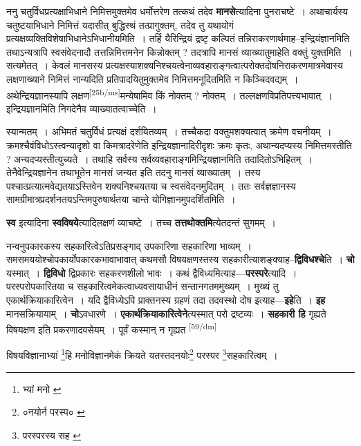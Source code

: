 \documentclass[article,12pt,a4paper]{memoir}
\begin{document}
	  \pstart ननु चतुर्विधप्रत्यक्षाभिधाने निमित्तमुक्तमेव धर्मोत्तरेण तत्कथं तदेव \textbf{मानसे}त्यादिना पुनराचष्टे । अथाचार्यस्य चतुष्टयाभिधाने निमित्तं यदासीत् बुद्धिस्थं तत्प्रागुक्तम्, तदेव तु यथायोगं प्रत्यक्षव्यक्तिविशेषाभिधानेऽभिधानीयमिति । तर्हि यैरिन्द्रियं द्रष्टृ कल्पितं तन्निराकरणार्थमाह--इन्द्रियंज्ञानमिति तथाऽन्यत्रापि स्वसंवेदनादौ तत्तन्निमित्तमनेन किन्नोक्तम् ? तदत्रापि मानसं व्याख्यातुमाहेति वक्तुं युक्तमिति । सत्यमेतत् । केवलं मानसस्य प्रत्यक्षस्याशक्यनिश्चयत्वेनाव्यवहाराङ्गत्वात्परोक्तदोषनिराकरणमात्रमेवास्य लक्षणाख्याने निमित्तं नान्यदिति प्रतिपादयितुमुक्तमेव निमित्तमनूदितमिति न किञ्चिदवद्यम् । अथेन्द्रियज्ञानस्यापि लक्षण\leavevmode\textsuperscript{\rmlatinfont\tiny [25b/ms]}मन्येषामिव किं नोक्तम् ? नोक्तम् । तल्लक्षणविप्रतिपत्त्यभावात् । इन्द्रियज्ञानमिति निगदेनैव व्याख्यातत्वाच्चेति ।
	\pend
      

	  \pstart स्यान्मतम् । अभिमतं चतुर्विधं प्रत्यक्षं दर्शयितव्यम् । तच्चैकदा वक्तुमशक्यत्वात् क्रमेण वचनीयम् । क्रमश्चैवंविधोऽस्त्वन्यादृशो वा किमत्रादरेणेति इन्द्रियज्ञानादिरीदृशः क्रमः कृतः, अथान्यदप्यस्य निमित्तमस्तीति ? अन्यदप्यस्तीत्युच्यते । तथाहि सर्वस्य सर्वव्यवहाराङ्गमिन्द्रियज्ञानमिति तदादितोऽभिहितम् । तेनैवेन्द्रियज्ञानेन तथाभूतेन मानसं जन्यत इति तदनु मानसं व्याख्यातम् । तस्य पश्चात्प्रत्यात्मवेद्यतयाऽस्तिवेन शक्यनिश्चयतया च स्वसंवेदनमुदितम् । ततः सर्वज्ञज्ञानस्य सामग्रीमात्रप्रदर्शनतयऽन्तिमपुरुषार्थतया चान्ते योगिज्ञानमुपदर्शितमिति ।
	\pend
      

	  \pstart \textbf{स्व} इत्यादिना \textbf{स्वविषये}त्यादिलक्षणं व्याचष्टे । तच्च \textbf{तत्तथोक्तमि}त्येतदन्तं सुगमम् ।
	\pend
      

	  \pstart नन्वनुपकारकस्य सहकारित्वेऽतिप्रसङ्गाद् उपकारिणा सहकारिणा भाव्यम् । समसमययोश्चोपकार्योपकारकभावाभावात् कथमसौ विषयक्षणस्तस्य सहकारीत्याशङ्क्याह--\textbf{द्विविधश्चे}ति । \textbf{चो} यस्मात् । \textbf{द्विविधो} द्विप्रकारः सहकरणशीलो भावः । कथं द्वैविध्यमित्याह—\textbf{परस्परे}त्यादि । परस्परोपकारितया च सहकारित्वमेकत्वाध्यवसायाधीनं सन्तानगतममुख्यम् । मुख्यं तु एकार्थक्रियाकारित्वेन । यदि द्वैविध्येऽपि प्राक्तनस्य ग्रहणं तदा तदवस्थो दोष इत्याह—\textbf{इहे}ति । \textbf{इह} मानसक्रियायाम् । \textbf{चो}ऽवधारणे । \textbf{एकार्थक्रियाकारित्वेने}त्यस्मात् परो द्रष्टव्यः । \textbf{सहकारी हि} गृह्यते विषयक्षण इति प्रकरणादवसेयम् । पूर्वं कस्मान् न गृह्यत  \leavevmode\textsuperscript{\rmlatinfont\tiny [59/dm]} 
	  
	विषयविज्ञानाभ्यां \footnote{भ्यां मनो \cite{dp-msD} \cite{dp-msB}}हि मनोविज्ञानमेकं क्रियते यतस्तदनयोः\footnote{०नयोर्न परस्प० \cite{dp-msA} \cite{dp-msC} \cite{dp-edP} \cite{dp-edH} \cite{dp-edE} \cite{dp-edN}} परस्पर \footnote{परस्परस्य सह \cite{dp-msB} \cite{dp-msD}}सहकारित्वम् । 
	  
\end{document}
